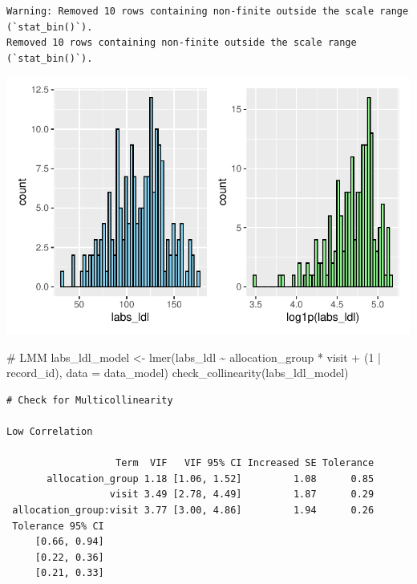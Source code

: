 \documentclass[
  letterpaper,
  DIV=11,
  numbers=noendperiod]{scrartcl}
\newenvironment{Shaded}{\begin{snugshade}}{\end{snugshade}}
\newcommand{\AttributeTok}[1]{\textcolor[rgb]{0.40,0.45,0.13}{#1}}
\newcommand{\CommentTok}[1]{\textcolor[rgb]{0.37,0.37,0.37}{#1}}
\newcommand{\DecValTok}[1]{\textcolor[rgb]{0.68,0.00,0.00}{#1}}
\newcommand{\FunctionTok}[1]{\textcolor[rgb]{0.28,0.35,0.67}{#1}}
\newcommand{\NormalTok}[1]{\textcolor[rgb]{0.00,0.23,0.31}{#1}}
\newcommand{\OtherTok}[1]{\textcolor[rgb]{0.00,0.23,0.31}{#1}}
\newcommand{\SpecialCharTok}[1]{\textcolor[rgb]{0.37,0.37,0.37}{#1}}
\begin{document}
\begin{verbatim}
Warning: Removed 10 rows containing non-finite outside the scale range (`stat_bin()`).
Removed 10 rows containing non-finite outside the scale range (`stat_bin()`).
\end{verbatim}

\includegraphics{Outcomes_V1V2V3_files/figure-pdf/labs_ldl_1-1.pdf}

\begin{Shaded}
\begin{Highlighting}[]
\CommentTok{\# LMM}
\NormalTok{labs\_ldl\_model }\OtherTok{\textless{}{-}} \FunctionTok{lmer}\NormalTok{(labs\_ldl }\SpecialCharTok{\textasciitilde{}}\NormalTok{ allocation\_group }\SpecialCharTok{*}\NormalTok{ visit }\SpecialCharTok{+}\NormalTok{ (}\DecValTok{1} \SpecialCharTok{|}\NormalTok{ record\_id), }\AttributeTok{data =}\NormalTok{ data\_model)}
\FunctionTok{check\_collinearity}\NormalTok{(labs\_ldl\_model)}
\end{Highlighting}
\end{Shaded}

\begin{verbatim}
# Check for Multicollinearity

Low Correlation

                   Term  VIF   VIF 95% CI Increased SE Tolerance
       allocation_group 1.18 [1.06, 1.52]         1.08      0.85
                  visit 3.49 [2.78, 4.49]         1.87      0.29
 allocation_group:visit 3.77 [3.00, 4.86]         1.94      0.26
 Tolerance 95% CI
     [0.66, 0.94]
     [0.22, 0.36]
     [0.21, 0.33]
\end{verbatim}
\end{document}

